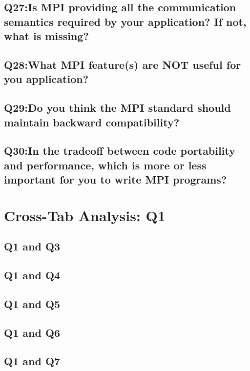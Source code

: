 \documentclass{report}
\begin{document}
\clearpage
\section{Q27:Is MPI providing all the communication semantics required by your application? If not, what is missing?}


\clearpage
\section{Q28:What MPI feature(s) are NOT useful for you application?}


\clearpage
\section{Q29:Do you think the MPI standard should maintain backward compatibility?}


\clearpage
\section{Q30:In the tradeoff between code portability and performance, which is more or less important for you to write MPI programs?}


\chapter{Cross-Tab Analysis: Q1}

\section{Q1 and Q3}


\clearpage
\section{Q1 and Q4}


\clearpage
\section{Q1 and Q5}


\clearpage
\section{Q1 and Q6}


\clearpage
\section{Q1 and Q7}

\end{document}
